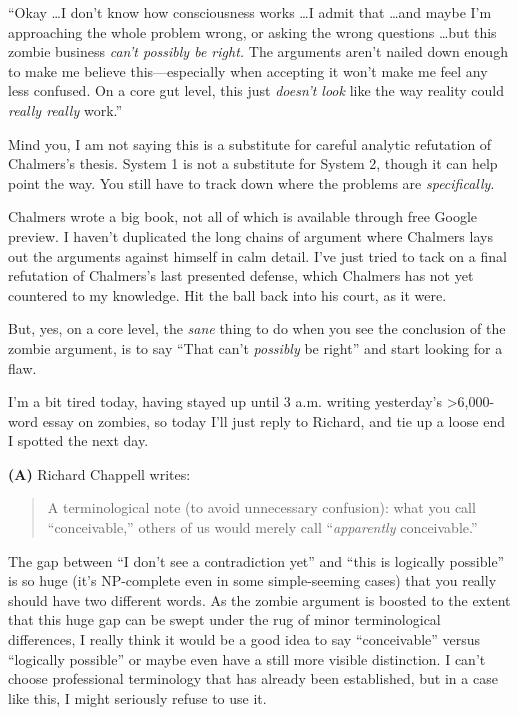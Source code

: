 {
 ``Okay \ldots I don't know how
consciousness works \ldots I admit that \ldots and maybe
I'm approaching the whole problem wrong, or asking the
wrong questions \ldots but this zombie business
\textit{can't possibly be right.} The arguments
aren't nailed down enough to make me believe
this---especially when accepting it won't make me feel
any less confused. On a core gut level, this just
\textit{doesn't look} like the way reality could
\textit{really really} work.''}

{
 Mind you, I am not saying this is a substitute for careful
analytic refutation of Chalmers's thesis. System 1 is
not a substitute for System 2, though it can help point the way. You
still have to track down where the problems are \textit{specifically}.}

{
 Chalmers wrote a big book, not all of which is available through
free Google preview. I haven't duplicated the long
chains of argument where Chalmers lays out the arguments against
himself in calm detail. I've just tried to tack on a
final refutation of Chalmers's last presented defense,
which Chalmers has not yet countered to my knowledge. Hit the ball back
into his court, as it were.}

{
 But, yes, on a core level, the \textit{sane} thing to do when you
see the conclusion of the zombie argument, is to say
``That can't \textit{possibly} be
right'' and start looking for a flaw.}

\myendsectiontext


\bigskip


{
 I'm a bit tired today, having stayed up until 3
a.m. writing yesterday's {\textgreater}6,000-word essay
on zombies, so today I'll just reply to Richard, and
tie up a loose end I spotted the next day.}

{
 \textbf{(A)} Richard Chappell writes:}

\begin{quotation}
{
 A terminological note (to avoid unnecessary confusion): what you
call ``conceivable,'' others of us
would merely call ``\textit{apparently}
conceivable.''}
\end{quotation}

{
 The gap between ``I don't see a
contradiction yet'' and ``this is
logically possible'' is so huge (it's
NP-complete even in some simple-seeming cases) that you really should
have two different words. As the zombie argument is boosted to the
extent that this huge gap can be swept under the rug of minor
terminological differences, I really think it would be a good idea to
say ``conceivable'' versus
``logically possible'' or maybe even
have a still more visible distinction. I can't choose
professional terminology that has already been established, but in a
case like this, I might seriously refuse to use it.}

